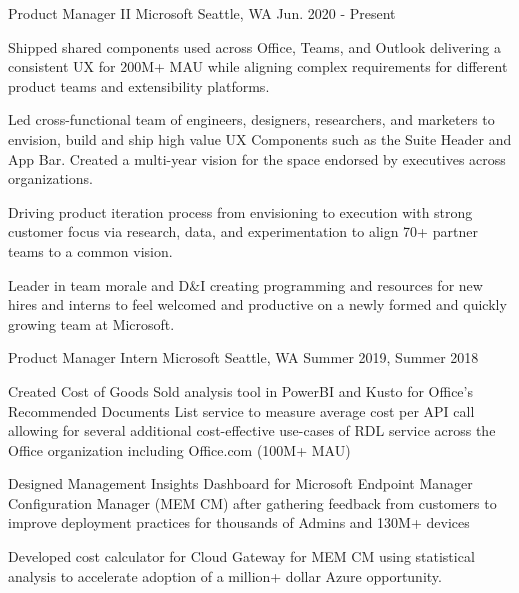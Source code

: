 

\begin{cventries}

  \cventry
    {Product Manager II} %
    {Microsoft} %
    {} %
    {Seattle, WA} %
    {Jun. 2020 - Present} %
    {
      \begin{cvitems} %
        \item {Shipped shared components used across Office, Teams, and Outlook delivering a consistent UX for 200M+ MAU while aligning complex requirements for different product teams and extensibility platforms.}
        \item{Led cross-functional team of engineers, designers, researchers, and marketers to envision, build and ship high value UX Components such as the Suite Header and App Bar. Created a multi-year vision for the space endorsed by executives across organizations.}
        \item {Driving product iteration process from envisioning to execution with strong customer focus via research, data, and experimentation to align 70+ partner teams to a common vision.}
        \item{Leader in team morale and D\&I creating programming and resources for new hires and interns to feel welcomed and productive on a newly formed and quickly growing team at Microsoft.}
      \end{cvitems}
    }

  \cventry
    {Product Manager Intern} %
    {Microsoft} %
    {} %
    {Seattle, WA} %
    {Summer 2019, Summer 2018} %
    {
      \begin{cvitems} %
        \item {Created Cost of Goods Sold analysis tool in PowerBI and Kusto for Office's Recommended Documents List service to measure average cost per API call allowing for several additional cost-effective use-cases of RDL service across the Office organization including Office.com (100M+ MAU)}
        \item {Designed Management Insights Dashboard for Microsoft Endpoint Manager Configuration Manager (MEM CM) after gathering feedback from customers to improve deployment practices for thousands of Admins and 130M+ devices}
        \item {Developed cost calculator for Cloud Gateway for MEM CM using statistical analysis to accelerate adoption of a million+ dollar Azure opportunity.}
      \end{cvitems}
    }


\end{cventries}
